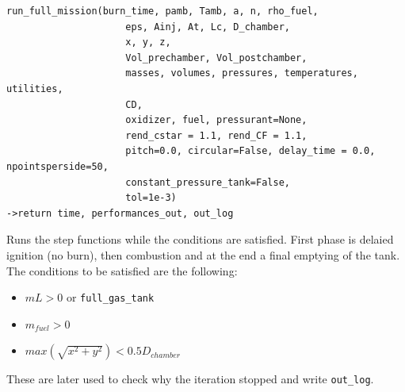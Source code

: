 \begin{table}[h!]
\centering
{}
\caption{Performance keys and values for burn and no-burn conditions.}
\label{Tab: PerfDicts}
\end{table}
\newpage
\begin{verbatim}
run_full_mission(burn_time, pamb, Tamb, a, n, rho_fuel,
                     eps, Ainj, At, Lc, D_chamber,
                     x, y, z,
                     Vol_prechamber, Vol_postchamber,
                     masses, volumes, pressures, temperatures, utilities,
                     CD,
                     oxidizer, fuel, pressurant=None,
                     rend_cstar = 1.1, rend_CF = 1.1,
                     pitch=0.0, circular=False, delay_time = 0.0, npointsperside=50, 
					 constant_pressure_tank=False,
                     tol=1e-3)
->return time, performances_out, out_log
\end{verbatim}

\hspace{2em} Runs the step functions while the conditions are satisfied. First phase is delaied ignition (no burn), then combustion and at the end a final emptying of the tank.
The conditions to be satisfied are the following:
\begin{itemize}
	\item $mL>0$ or \verb|full_gas_tank|
	\item $m_{fuel}>0$
	\item $max(\sqrt{x^2+y^2})<0.5D_{chamber}$
\end{itemize}
These are later used to check why the iteration stopped and write \verb|out_log|.

